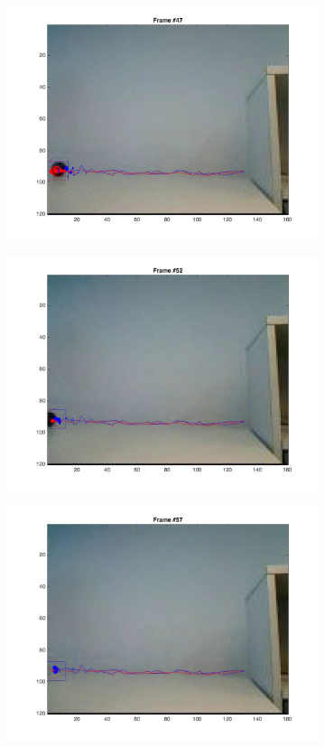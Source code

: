\documentclass{ethz_report}
\begin{document}
\begin{figure}[h]
\begin{subfigure}[b]{.25\textwidth}
        \includegraphics[width=1\linewidth]{images/video3__46}
    \end{subfigure}%
    \begin{subfigure}[b]{.25\textwidth}
        \centering
        \includegraphics[width=1\linewidth]{images/video3__51}
    \end{subfigure}%
    \begin{subfigure}[b]{.25\textwidth}
        \centering
        \includegraphics[width=1\linewidth]{images/video3__56}

\end{subfigure}
\end{figure}
\end{document}
